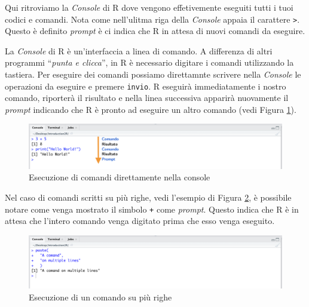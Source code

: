 \documentclass[
]{book}
\begin{document}
Qui ritroviamo la \emph{Console} di R dove vengono effetivemente eseguiti tutti i tuoi codici e comandi. Nota come nell'ulitma riga della \emph{Console} appaia il carattere \texttt{\textgreater{}}. Questo è definito \emph{prompt} è ci indica che R in attesa di nuovi comandi da eseguire.

La \emph{Console} di R è un'interfaccia a linea di comando. A differenza di altri programmi ``\emph{punta e clicca}'', in R è necessario digitare i comandi utilizzando la tastiera. Per eseguire dei comandi possiamo direttamnte scrivere nella \emph{Console} le operazioni da eseguire e premere \texttt{invio}. R eseguirà immediatamente i nostro comando, riporterà il risultato e nella linea successiva apparirà nuovamente il \emph{prompt} indicando che R è pronto ad eseguire un altro comando (vedi Figura \ref{fig:comand-sequence}).

\begin{figure}

{\centering \includegraphics[width=0.95\linewidth]{images/comand-sequence} 

}

\caption{Esecuzione di comandi direttamente nella console}\label{fig:comand-sequence}
\end{figure}

Nel caso di comandi scritti su più righe, vedi l'esempio di Figura \ref{fig:multiple-line-comand}, è possibile notare come venga mostrato il simbolo \texttt{+} come \emph{prompt}. Questo indica che R è in attesa che l'intero comando venga digitato prima che esso venga eseguito.

\begin{figure}

{\centering \includegraphics[width=0.95\linewidth]{images/multiple-line-comand} 

}

\caption{Esecuzione di un comando su più righe}\label{fig:multiple-line-comand}
\end{figure}
\end{document}
